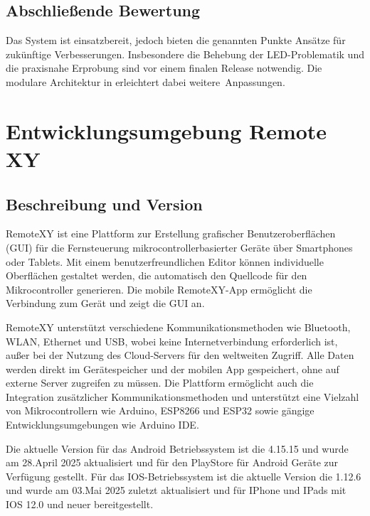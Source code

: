 \subsection*{Abschließende Bewertung}
Das System ist einsatzbereit, jedoch bieten die genannten Punkte Ansätze für zukünftige Verbesserungen. Insbesondere die Behebung der LED-Problematik und die praxisnahe Erprobung sind vor einem finalen Release notwendig. Die modulare Architektur in  erleichtert dabei weitere Anpassungen.





	\section{Entwicklungsumgebung Remote XY}

\subsection{Beschreibung und Version}
RemoteXY ist eine Plattform zur Erstellung grafischer Benutzeroberflächen (GUI) für die Fernsteuerung mikrocontrollerbasierter Geräte über Smartphones oder Tablets. Mit einem benutzerfreundlichen Editor können individuelle Oberflächen gestaltet werden, die automatisch den Quellcode für den Mikrocontroller generieren. Die mobile RemoteXY-App ermöglicht die Verbindung zum Gerät und zeigt die GUI an.
\cite{RemoteXY:Start}

\vspace{1\baselineskip}

RemoteXY unterstützt verschiedene Kommunikationsmethoden wie Bluetooth, WLAN, Ethernet und USB, wobei keine Internetverbindung erforderlich ist, außer bei der Nutzung des Cloud-Servers für den weltweiten Zugriff. Alle Daten werden direkt im Gerätespeicher und der mobilen App gespeichert, ohne auf externe Server zugreifen zu müssen. Die Plattform ermöglicht auch die Integration zusätzlicher Kommunikationsmethoden und unterstützt eine Vielzahl von Mikrocontrollern wie Arduino, ESP8266 und ESP32 sowie gängige Entwicklungsumgebungen wie Arduino IDE.
\cite{RemoteXY:Start}
\cite{RemoteXY:GooglePlayStore}

\vspace{1\baselineskip}

Die aktuelle Version für das Android Betriebssystem ist die 4.15.15 und wurde am 28.April 2025 aktualisiert und für den PlayStore für Android Geräte zur Verfügung gestellt. Für das IOS-Betriebssystem ist die aktuelle Version die 1.12.6 und wurde am 03.Mai 2025 zuletzt aktualisiert und für IPhone und IPads mit IOS 12.0 und neuer bereitgestellt.
\cite{RemoteXY:GooglePlayStore}
\cite{RemoteXY:AppStore}

